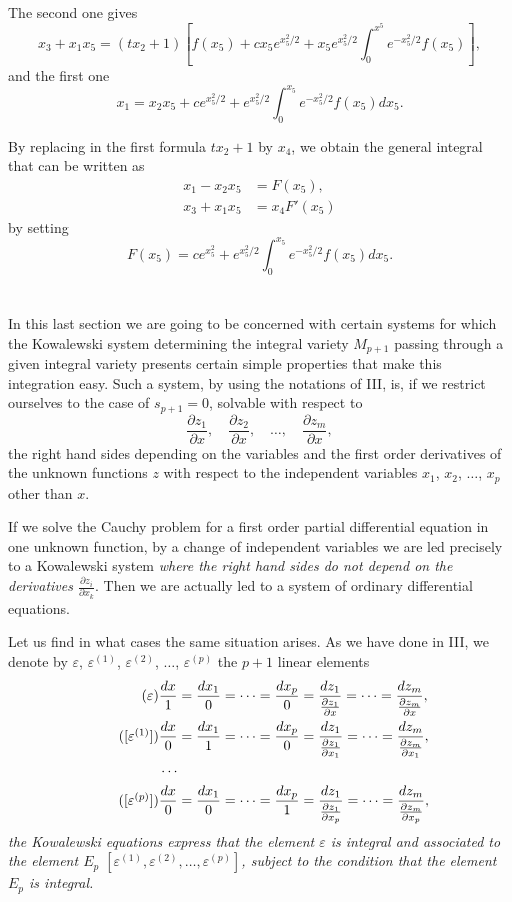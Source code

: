 \documentclass[leqno,11pt]{book}
\makeatletter
\newcommand{\pd}{\partial}
\theoremstyle{shape1}
\theoremstyle{shapesmall}
\let\old@epsilon\epsilon
\let\old@varepsilon\varepsilon
\let\epsilon\old@varepsilon
\let\varepsilon\old@epsilon
\makeatother
\begin{document}
The second one gives
\[
x_{3}+x_{1}x_{5}=(tx_{2}+1)\left[f(x_{5})+cx_{5}e^{x^{2}_{5}/2}+x_{5}e^{x^{2}_{5}/2}\int_{0}^{x^{5}}e^{-x^{2}_{5}/2}f(x_{5})\right],
\]
and the first one
\[
x_{1}=x_{2}x_{5}+ce^{x^{2}_{5}/2}+e^{x_{5}^{2}/2}\int_{0}^{x_{5}}e^{-x_{5}^{2}/2}f(x_{5})dx_{5}.
\]

By replacing in the first formula $t x_{2}+1$ by $x_{4}$, we obtain the general integral that can be written as
\begin{align*}
  x_{1}-x_{2}x_{5}&=F(x_{5}),\\
  x_{3}+x_{1}x_{5}&=x_{4}F'(x_{5})
\end{align*}
by setting
\[
F(x_{5})=ce^{x^{2}_{5}}+e^{x_{5}^{2}/2}\int_{0}^{x_{5}}e^{-x_{5}^{2}/2}f(x_{5})dx_{5}.
\]

\section{}
\label{sec:8}

In this last section we are going to be concerned with certain systems for which the Kowalewski system determining the integral variety $M_{p+1}$ passing through a given integral variety presents certain simple properties that make this integration easy. Such a system, by using the notations of \textsection III, is, if we restrict ourselves to the case of $s_{p+1}=0$, solvable with respect to
\[
\frac{\pd z_{1}}{\pd x},\quad\frac{\pd z_{2}}{\pd x},\quad\dots,\quad\frac{\pd z_{m}}{\pd x},
\]
the right hand sides depending on the variables and the first order derivatives of the unknown functions $z$ with respect to the independent variables $x_{1}$, $x_{2}$, $\dots$, $x_{p}$ other than $x$.

If we solve the Cauchy problem for a first order partial differential equation in one unknown function, by a change of independent variables we are led precisely to a Kowalewski system \emph{where the right hand sides do not depend on the derivatives $\frac{\pd z_{i}}{\pd x_{k}}$}. Then we are actually led to a system of ordinary differential equations.

Let us find in what cases the same situation arises. As we have done in \textsection III, we denote by $\epsilon$, $\epsilon^{(1)}$, $\epsilon^{(2)}$, $\dots$, $\epsilon^{(p)}$ the $p+1$ linear elements
\begin{align*}
  \tag{$\epsilon$}
&  \frac{dx}{1}=\frac{dx_{1}}{0}=\dots=\frac{dx_{p}}{0}=\frac{dz_{1}}{\frac{\pd z_{1}}{\pd x}}=\dots=\frac{dz_{m}}{\frac{\pd z_{m}}{\pd x}},\\
  \tag{$[\epsilon^{(1)}]$}
&  \frac{dx}{0}=\frac{dx_{1}}{1}=\dots=\frac{dx_{p}}{0}=\frac{dz_{1}}{\frac{\pd z_{1}}{\pd x_{1}}}=\dots=\frac{dz_{m}}{\frac{\pd z_{m}}{\pd x_{1}}},\\
&  \cdots\\
  \tag{$[\epsilon^{(p)}]$}
&  \frac{dx}{0}=\frac{dx_{1}}{0}=\dots=\frac{dx_{p}}{1}=\frac{dz_{1}}{\frac{\pd z_{1}}{\pd x_{p}}}=\dots=\frac{dz_{m}}{\frac{\pd z_{m}}{\pd x_{p}}},
\end{align*}
\emph{the Kowalewski equations express that the element $\epsilon$ is integral and associated to the element $E_{p}$ $[\epsilon^{(1)}, \epsilon^{(2)}, \dots, \epsilon^{(p)}]$, subject to the condition that the element $E_{p}$ is integral.}
\end{document}
